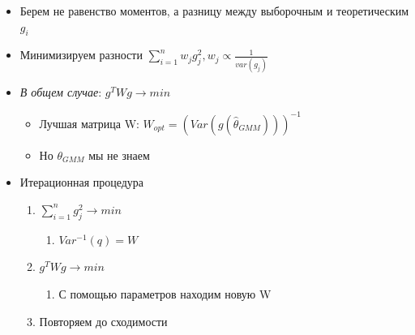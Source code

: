 \documentclass[a4paper, 12pt]{article}
\begin{document}
\begin{itemize}
    \item Берем не равенство моментов, а разницу между выборочным и теоретическим $g_{i}$
    \item Минимизируем разности $\sum_{i = 1}^{n}w_{j}g_{j}^{2}, w_{j} \propto \frac{1}{var(g_{j})}$
    \item \textit{В общем случае}: $g^{T}Wg \rightarrow min$
    \begin{itemize}
        \item Лучшая матрица W: $W_{opt} = (Var(g(\hat{\theta}_{GMM})))^{-1}$
        \item Но $\theta_{GMM}$ мы не знаем
    \end{itemize}
    \item Итерационная процедура
    \begin{enumerate}
        \item $\sum_{i = 1}^{n}g_{j}^{2} \rightarrow min$
        \begin{enumerate}
            \item $Var^{-1}(q) = W$
        \end{enumerate}
        \item $g^{T}Wg \rightarrow min$
        \begin{enumerate}
            \item С помощью параметров находим новую W
        \end{enumerate}
        \item Повторяем до сходимости
    \end{enumerate}
\end{itemize}
\end{document}

